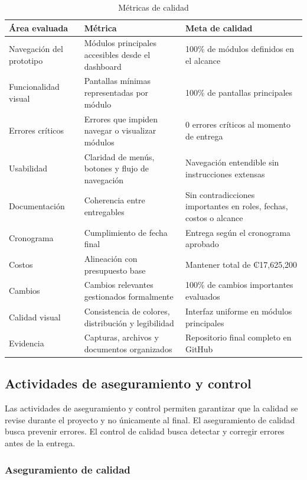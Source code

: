 \documentclass[11pt,spanish]{article}
\begin{document}
\begin{table}[H]
\centering
\caption{Métricas de calidad}
\label{tab:metricas-calidad}
{\small
\setlength{\tabcolsep}{3.5pt}
\begin{tabularx}{\textwidth}{p{3.8cm} Y Y}
\toprule
\textbf{Área evaluada} & \textbf{Métrica} & \textbf{Meta de calidad} \\
\midrule
Navegación del prototipo & Módulos principales accesibles desde el dashboard & 100\% de módulos definidos en el alcance \\
Funcionalidad visual & Pantallas mínimas representadas por módulo & 100\% de pantallas principales \\
Errores críticos & Errores que impiden navegar o visualizar módulos & 0 errores críticos al momento de entrega \\
Usabilidad & Claridad de menús, botones y flujo de navegación & Navegación entendible sin instrucciones extensas \\
Documentación & Coherencia entre entregables & Sin contradicciones importantes en roles, fechas, costos o alcance \\
Cronograma & Cumplimiento de fecha final & Entrega según el cronograma aprobado \\
Costos & Alineación con presupuesto base & Mantener total de ₡17,625,200 \\
Cambios & Cambios relevantes gestionados formalmente & 100\% de cambios importantes evaluados \\
Calidad visual & Consistencia de colores, distribución y legibilidad & Interfaz uniforme en módulos principales \\
Evidencia & Capturas, archivos y documentos organizados & Repositorio final completo en GitHub \\
\bottomrule
\end{tabularx}
}
\end{table}

\subsection{Actividades de aseguramiento y control}

Las actividades de aseguramiento y control permiten garantizar que la calidad se revise durante el proyecto y no únicamente al final. El aseguramiento de calidad busca prevenir errores. El control de calidad busca detectar y corregir errores antes de la entrega.

\subsubsection{Aseguramiento de calidad}
\end{document}
